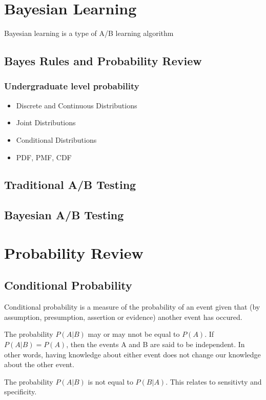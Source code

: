 \documentclass[11pt]{article}
\author{Monib Ahmed}
\date{\today}
\title{}
\begin{document}
\tableofcontents

\section{Bayesian Learning}
\label{sec:org3f147b4}
Bayesian learning is a type of A/B learning algorithm
\subsection{Bayes Rules and Probability Review}
\label{sec:org00782f5}
\subsubsection{Undergraduate level probability}
\label{sec:orgdf81f5d}
\begin{itemize}
\item Discrete and Continuous Distributions
\item Joint Distributions
\item Conditional Distributions
\item PDF, PMF, CDF
\end{itemize}
\subsection{Traditional A/B Testing}
\label{sec:org1653e68}
\subsection{Bayesian A/B Testing}
\label{sec:org7370af2}

\section{Probability Review}
\label{sec:org597c699}
\subsection{Conditional Probability}
\label{sec:org3149781}
Conditional probability is a measure of the probability of an event
given that (by assumption, presumption, assertion or evidence) another
event has occured. 

The probability \(P(A|B)\) may or may nnot be equal to \(P(A)\). If
\(P(A|B) = P(A)\), then the events A and B are said to be
independent. In other words, having knowledge about either event does
not change our knowledge about the other event.

The probability \(P(A|B)\) is not equal to \(P(B|A)\). This relates to
sensitivty and specificity.
\end{document}
